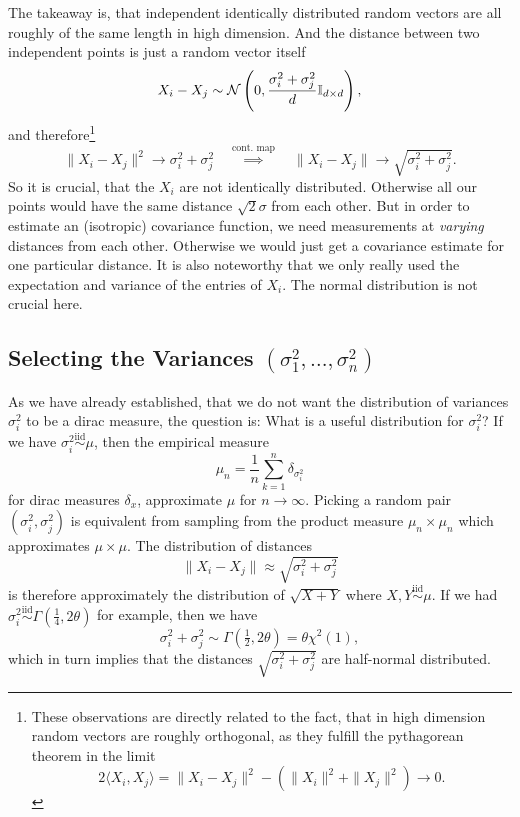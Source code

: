 The takeaway is, that independent identically distributed random vectors are
all roughly of the same length in high dimension. And the distance between
two independent points is just a random vector itself
\[
	X_i-X_j\sim\mathcal{N}\left(
		0,\frac{\sigma_i^2+\sigma_j^2}{d}\mathbb{I}_{d\times d}
	\right),
\]
and therefore\footnote{
	These observations are directly related to the fact, that in high dimension
	random vectors are roughly orthogonal, as they fulfill the pythagorean
	theorem in the limit
	\[
		2\langle X_i, X_j\rangle = \|X_i-X_j\|^2 - (\|X_i\|^2 + \|X_j\|^2) \to 0.
	\]
}
\[
	\|X_i- X_j\|^2 \to \sigma_i^2 + \sigma_j^2
	\quad\overset{\text{cont. map}}\implies \quad
	\|X_i-X_j\|\to\sqrt{\sigma_i^2+\sigma_j^2}.
\]
So it is crucial, that the \(X_i\) are not identically distributed. Otherwise
all our points would have the same distance \(\sqrt{2}\sigma\) from each other. But
in order to estimate an (isotropic) covariance function,
we need measurements at \emph{varying} distances from each other. Otherwise we would
just get a covariance estimate for one particular distance. It is also noteworthy
that we only really used the expectation and variance of the entries of \(X_i\).
The normal distribution is not crucial here.

\subsection{Selecting the Variances \texorpdfstring{\((\sigma_1^2,\dots,\sigma_n^2)\)}{(σ₁²,...,σₙ²)}}

As we have already established, that we do not want the distribution of
variances \(\sigma_i^2\) to be a dirac measure, the question is: What is a
useful distribution for \(\sigma_i^2\)? If we have
\(\sigma_i^2\overset{\text{iid}}\sim\mu\), then the empirical measure
\[
	\mu_n = \frac1n\sum_{k=1}^n \delta_{\sigma_i^2}
\]
for dirac measures \(\delta_x\), approximate \(\mu\) for \(n\to\infty\). Picking
a random pair \((\sigma_i^2,\sigma_j^2)\) is equivalent from sampling from the
product measure \(\mu_n \times \mu_n\) which approximates \(\mu\times\mu\).
The distribution of distances
\[
	\|X_i-X_j\| \approx \sqrt{\sigma_i^2 + \sigma_j^2}
\]
is therefore approximately the distribution of \(\sqrt{X+Y}\) where
\(X,Y\overset{\text{iid}}\sim\mu\). If we had
\(\sigma_i^2\overset{\text{iid}}{\sim}\Gamma(\tfrac14,2\theta)\) for example,
then we have
\[
	\sigma_i^2 + \sigma_j^2 \sim \Gamma(\tfrac12,2\theta) = \theta\chi^2(1),
\]
which in turn implies that the distances \(\sqrt{\sigma_i^2 + \sigma_j^2}\)
are half-normal distributed.

